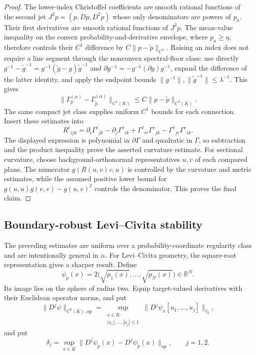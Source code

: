 \documentclass[11pt]{article}
\theoremstyle{definition}
\theoremstyle{remark}
\newcommand{\R}{\mathbb{R}}
\newcommand{\op}{\mathrm{op}}
\begin{document}
\begin{proof}
The lower-index Christoffel coefficients are smooth rational functions of the
second jet $J^2p=(p,Dp,D^2p)$ whose only denominators are powers of $p_a$.
Their first derivatives are smooth rational functions of $J^3p$. The
mean-value inequality on the convex probability-and-derivative envelope, where
$p_a\ge\eta$, therefore controls their $C^1$ difference by
$C\|p-\widetilde p\|_{C^3}$. Raising an index does not require a line segment
through the nonconvex spectral-floor class: use directly
$g^{-1}-\widetilde g^{-1}=g^{-1}(\widetilde g-g)\widetilde g^{-1}$ and
$\partial g^{-1}=-g^{-1}(\partial g)g^{-1}$, expand the difference of the
latter identity, and apply the endpoint bounds
$\|g^{-1}\|,\|\widetilde g^{-1}\|\le\lambda^{-1}$. This gives
\begin{equation}
  \|\Gamma_p^{(\alpha)}-\Gamma_{\widetilde p}^{(\alpha)}\|_{C^1(K)}
  \le C\|p-\widetilde p\|_{C^3(K)}.
\end{equation}
The same compact jet class supplies uniform $C^1$ bounds for each connection.
Insert these estimates into
\begin{equation}
    R^\ell{}_{ijk}=\partial_i\Gamma^\ell{}_{jk}-\partial_j\Gamma^\ell{}_{ik}
    +\Gamma^\ell{}_{ir}\Gamma^r{}_{jk}-\Gamma^\ell{}_{jr}\Gamma^r{}_{ik}.
\end{equation}
The displayed expression is polynomial in $\partial\Gamma$ and quadratic in
$\Gamma$, so subtraction and the product inequality prove the asserted
curvature estimate. For sectional curvature, choose background-orthonormal
representatives $u,v$ of each compared plane. The numerator
$g(R(u,v)v,u)$ is controlled by the curvature and metric estimates, while the
assumed positive lower bound for
$g(u,u)g(v,v)-g(u,v)^2$ controls the denominator. This proves the final claim.
\end{proof}

\subsection{Boundary-robust Levi--Civita stability}

The preceding estimates are uniform over a probability-coordinate regularity class and are intentionally general in $\alpha$. For Levi--Civita geometry, the square-root representation gives a sharper result. Define
\begin{equation}
    \psi_p(x)=2\bigl(\sqrt{p_1(x)},\ldots,\sqrt{p_N(x)}\bigr)
    \in\R^N.
    \label{eq:square-root-map}
\end{equation}
Its image lies on the sphere of radius two. Equip target-valued derivatives with their Euclidean operator norms, and put
\begin{equation}
    \|D^j\psi\|_{C^0(K),\op}
    =\sup_{\substack{x\in K\\|u_1|,\ldots,|u_j|\le1}}
      \|D^j\psi_x[u_1,\ldots,u_j]\|_{\ell_2},
\end{equation}
and put
\begin{equation}
    \delta_j=\sup_{x\in K}\|D^j\psi_p(x)-D^j\psi_{\widetilde p}(x)\|_{\op},
    \qquad j=1,2.
\end{equation}
\end{document}
